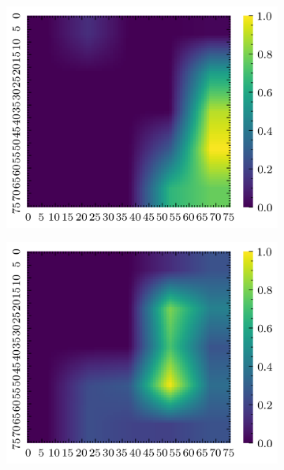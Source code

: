 \documentclass[../document.tex]{subfiles}
\begin{document}
\begin{figure}[H]
    \begin{subfigure}[b]{0.19\textwidth}
        \includegraphics[width=\linewidth]{../img/5/quarry/false_positive/grad-cam-2d-0.png}
    \end{subfigure}
    \begin{subfigure}[b]{0.19\textwidth}
        \includegraphics[width=\linewidth]{../img/5/quarry/false_positive/grad-cam-2d-1.png}
    \end{subfigure}  
    \begin{subfigure}[b]{0.19\textwidth}

\end{subfigure}
\end{figure}
\end{document}

